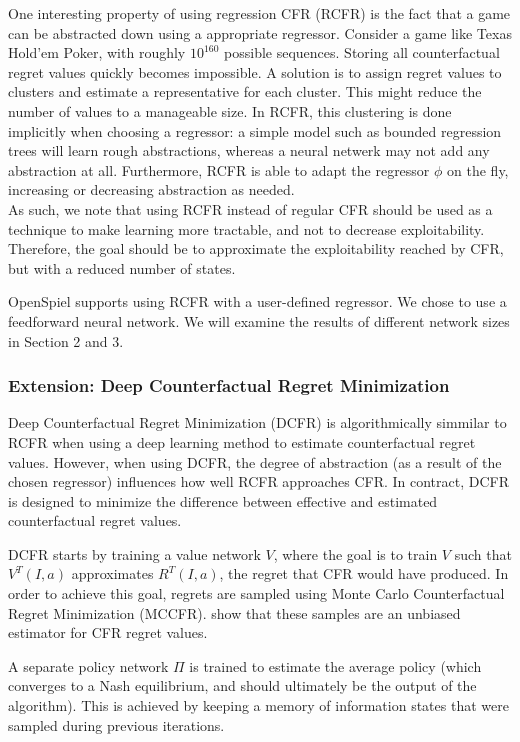 \documentclass[10pt,a4paper]{article}
\begin{document}
One interesting property of using regression CFR (RCFR) is the fact that a game can be abstracted down using a appropriate regressor. Consider a game like Texas Hold'em Poker, with roughly $10^{160}$ possible sequences. Storing all counterfactual regret values quickly becomes impossible. A solution is to assign regret values to clusters and estimate a representative for each cluster. This might reduce the number of values to a manageable size. In RCFR, this clustering is done implicitly when choosing a regressor: a simple model such as bounded regression trees will learn rough abstractions, whereas a neural netwerk may not add any abstraction at all. Furthermore, RCFR is able to adapt the regressor $\phi$ on the fly, increasing or decreasing abstraction as needed.\\

As such, we note that using RCFR instead of regular CFR should be used as a technique to make learning more tractable, and not to decrease exploitability. Therefore, the goal should be to approximate the exploitability reached by CFR, but with a reduced number of states.

OpenSpiel supports using RCFR with a user-defined regressor. We chose to use a feedforward neural network. We will examine the results of different network sizes in Section 2 and 3.

\subsubsection{Extension: Deep Counterfactual Regret Minimization}
Deep Counterfactual Regret Minimization (DCFR) is algorithmically simmilar to RCFR when using a deep learning method to estimate counterfactual regret values. However, when using DCFR, the degree of abstraction (as a result of the chosen regressor) influences how well RCFR approaches CFR. In contract, DCFR is designed to minimize the difference between effective and estimated counterfactual regret values.

DCFR starts by training a value network $V$, where the goal is to train $V$ such that $V^{T}(I,a)$ approximates $R^{T}(I,a)$, the regret that CFR would have produced. In order to achieve this goal, regrets are sampled using Monte Carlo Counterfactual Regret Minimization (MCCFR). \citeauthor{dcfr} show that these samples are an unbiased estimator for CFR regret values.\citep{dcfr}

A separate policy network $\Pi$ is trained to estimate the average policy (which converges to a Nash equilibrium, and should ultimately be the output of the algorithm). This is achieved by keeping a memory of information states that were sampled during previous iterations.
\end{document}
